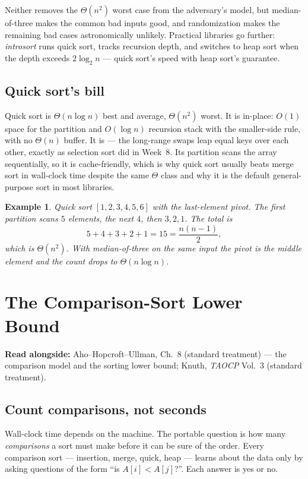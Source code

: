 \documentclass[11pt]{article}
\newtheorem{example}{Example}[section]
\begin{document}
Neither removes the $\Theta(n^2)$ worst case from the adversary's model, but median-of-three makes the common bad inputs good, and randomization makes the remaining bad cases astronomically unlikely. Practical libraries go further: \emph{introsort} runs quick sort, tracks recursion depth, and switches to heap sort when the depth exceeds $2\log_2 n$ --- quick sort's speed with heap sort's guarantee.

\subsection{Quick sort's bill}

Quick sort is $\Theta(n\log n)$ best and average, $\Theta(n^2)$ worst. It is in-place: $O(1)$ space for the partition and $O(\log n)$ recursion stack with the smaller-side rule, with no $\Theta(n)$ buffer. It is  --- the long-range swaps leap equal keys over each other, exactly as selection sort did in Week~8. Its partition scans the array sequentially, so it is cache-friendly, which is why quick sort usually beats merge sort in wall-clock time despite the same $\Theta$ class and why it is the default general-purpose sort in most libraries.

\begin{example}
Quick sort $[1,2,3,4,5,6]$ with the last-element pivot. The first partition scans $5$ elements, the next $4$, then $3,2,1$. The total is
\[
  5+4+3+2+1 = 15 = \frac{n(n-1)}{2},
\]
which is $\Theta(n^2)$. With median-of-three on the same input the pivot is the middle element and the count drops to $\Theta(n\log n)$.
\end{example}

\section{The Comparison-Sort Lower Bound}

\textbf{Read alongside:} Aho--Hopcroft--Ullman, Ch.~8 (standard treatment) --- the comparison model and the sorting lower bound; Knuth, \textit{TAOCP} Vol.~3 (standard treatment).

\subsection{Count comparisons, not seconds}

Wall-clock time depends on the machine. The portable question is how many \emph{comparisons} a sort must make before it can be sure of the order. Every comparison sort --- insertion, merge, quick, heap --- learns about the data only by asking questions of the form ``is $A[i] < A[j]$?''. Each answer is yes or no.
\end{document}
